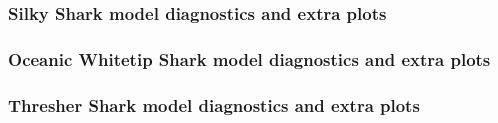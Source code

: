 \documentclass[12pt]{SCreport}
\begin{document}
  
 
 
 
 
 
 
 \subsubsection*{Silky Shark model diagnostics and extra plots}
 

\subsubsection*{Oceanic Whitetip Shark model diagnostics and extra plots}

 
  
\subsubsection*{Thresher Shark model diagnostics and extra plots}
\end{document}
